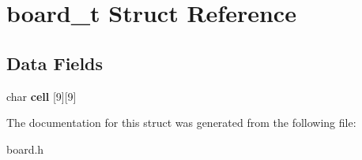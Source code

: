 \hypertarget{structboard__t}{}\section{board\+\_\+t Struct Reference}
\label{structboard__t}
\subsection*{Data Fields}
\begin{DoxyCompactItemize}
\item 
\mbox{\label{structboard__t_a9d46b09a58e1b9da4821c00dc821f7a6}} 
char {\bfseries cell} \mbox{[}9\mbox{]}\mbox{[}9\mbox{]}
\end{DoxyCompactItemize}


The documentation for this struct was generated from the following file\+:\begin{DoxyCompactItemize}
\item 
board.\+h\end{DoxyCompactItemize}
